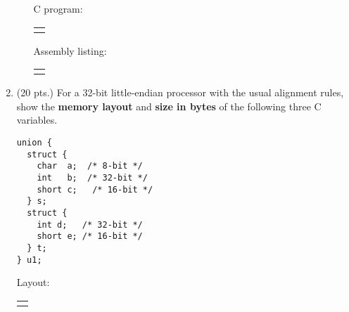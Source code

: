 \documentclass[letterpaper]{article}
\makeatletter
\newif\ifkey
\newcommand{\field}[2][]{
  \begin{tabular}{@{}c@{}}
    \fbox{\TextField[borderwidth=0,charsize=12pt,multiline=true,name={#2},#1]{}}
  \end{tabular}
  }
\makeatother
\begin{document}
\begin{Form}
\begin{enumerate}
\begin{enumerate}
  C program:
  
  \field[height=16pc,width=40pc]{1c}

  \newpage

  Assembly listing:

  \field[height=9in,width=40pc]{1casm}

\ifkey
\begin{lstlisting}
int a[2][3]; /* Globals not optimized */
int i, j;    /* Make names readable */

int access() {
  return a[i][j];
}
\end{lstlisting}

\begin{verbatim}
$ gcc -O -S hw3-1.c
\end{verbatim}

\begin{verbatim}
access:
  movslq j(%rip), %rdx        ! j in %rdx
  movslq i(%rip), %rax        ! i in %rax 
  leaq   (%rax,%rax,2), %rax  ! i + 2i = 3i
  addq   %rdx, %rax           ! 3i + j
  movl   a(,%rax,4), %eax     ! a + 4(3i + j)
  ret



        .file   "hw3-1.c"
        .text
        .globl  access
        .type   access, @function
access:
.LFB0:
        .cfi_startproc
        movslq  j(%rip), %rax
        movslq  i(%rip), %rdx
        leaq    (%rdx,%rdx,2), %rdx
        addq    %rdx, %rax
        movl    a(,%rax,4), %eax
        ret
        .cfi_endproc
.LFE0:
        .size   access, .-access
        .comm   j,4,4
        .comm   i,4,4
        .comm   a,24,16
        .ident  "GCC: (Ubuntu 5.4.0-6ubuntu1~16.04.10) 5.4.0 20160609"
        .section        .note.GNU-stack,"",@progbits

\end{verbatim}
\fi

\end{enumerate}

\newpage

\item (20 pts.) For a 32-bit little-endian processor with the usual alignment
  rules, show the \textbf{memory layout} and \textbf{size in bytes} of
  the following three C variables.

  \begin{minipage}{0.3\textwidth}
\begin{lstlisting}
union {
  struct {
    char  a;  /* 8-bit */
    int   b;  /* 32-bit */
    short c;   /* 16-bit */
  } s;
  struct {
    int d;   /* 32-bit */
    short e; /* 16-bit */
  } t;
} u1;
\end{lstlisting}
  \end{minipage}%
  \begin{minipage}{0.6\textwidth}
    Layout: \field[height=6pc,width=20pc]{2a}


\end{minipage}
\end{enumerate}
\end{Form}
\end{document}
